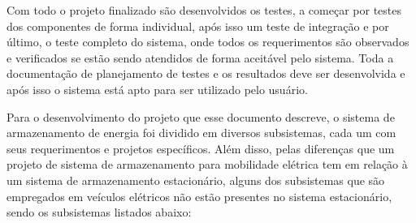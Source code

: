 Com todo o projeto finalizado são desenvolvidos os testes, a começar por testes dos componentes de forma individual, após isso um teste de integração e por último, o teste completo do sistema, onde todos os requerimentos são observados e verificados se estão sendo atendidos de forma aceitável pelo sistema. Toda a documentação de planejamento de testes e os resultados deve ser desenvolvida e após isso o sistema está apto para ser utilizado pelo usuário.

Para o desenvolvimento do projeto que esse documento descreve, o sistema de armazenamento de energia foi dividido em diversos subsistemas, cada um com seus requerimentos e projetos específicos. Além disso, pelas diferenças que um projeto de sistema de armazenamento para mobilidade elétrica tem em relação à um sistema de armazenamento estacionário, alguns dos subsistemas que são empregados em veículos elétricos não estão presentes no sistema estacionário, sendo os subsistemas listados abaixo:

